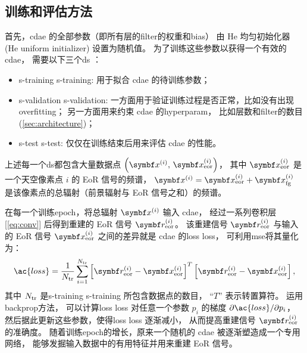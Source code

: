 \subsection{训练和评估方法}
\label{sec:train-eval}

首先，\ac{cdae} 的全部参数（即所有层的\ac{filter}的权重和\ac{bias}）
由 He 均匀初始化器 (He uniform initializer)\cite{he2015} 设置为随机值。
为了训练这些参数以获得一个有效的 \ac{cdae}，
需要以下三个\ac{ds} \cite{ripley1996}：
\begin{itemize}
  \item \acl{s-training} \ac{s-training}:
    用于拟合 \ac{cdae} 的待训练参数；
  \item \acl{s-validation} \ac{s-validation}:
    一方面用于验证训练过程是否正常，比如没有出现\ac{overfitting}；
    另一方面用来约束 \ac{cdae} 的\ac{hyperparam}，
    比如层数和\ac{filter}的数目 (\autoref{sec:architecture})；
  \item \acl{s-test} \ac{s-test}:
    仅仅在训练结束后用来评估 \ac{cdae} 的性能。
\end{itemize}
上述每一个\ac{ds}都包含大量数据点
$\left( \B{x}^{(i)}, \,\B{x}^{(i)}_{\R{eor}} \right)$，
其中 $\B{x}^{(i)}_{\R{eor}}$ 是一个天空像素点 $i$ 的 EoR 信号的频谱，
$\B{x}^{(i)} = \B{x}^{(i)}_{\R{eor}} + \B{x}^{(i)}_{\R{fg}}$
是该像素点的总辐射（前景辐射与 EoR 信号之和）的频谱。

在每一个训练\ac{epoch}，将总辐射 $\B{x}^{(i)}$ 输入 \ac{cdae}，
经过一系列卷积层 [\autoref{eq:conv}]
后得到重建的 EoR 信号 $\B{r}^{(i)}_{\R{eor}}$。
该重建信号 $\B{r}^{(i)}_{\R{eor}}$ 与输入的 EoR 信号 $\B{x}^{(i)}_{\R{eor}}$
之间的差异就是 \ac{cdae} 的\acl{loss} \ac{loss}，
可利用\ac{mse}将其量化为：
\begin{equation}
  \label{eq:loss}
  \ac{loss} = \frac{1}{N_{\R{tr}}} \sum_{i=1}^{N_{\R{tr}}}
    \left[ \B{r}_{\R{eor}}^{(i)} - \B{x}_{\R{eor}}^{(i)} \right]^T
    \left[ \B{r}_{\R{eor}}^{(i)} - \B{x}_{\R{eor}}^{(i)} \right] ,
\end{equation}
其中 $N_{\mathrm{tr}}$ 是\acl{s-training} \ac{s-training} 所包含数据点的数目，
\enquote{$T$} 表示转置算符。
运用\ac{backprop}方法\cite{rumelhart1986,leCun1998bp}，
可以计算\acl{loss} \ac{loss} 对任意一个参数 $p_i$ 的梯度
$\partial \ac{loss} / \partial p_i$，
然后据此更新这些参数，使得\acl{loss} \ac{loss} 逐渐减小，
从而提高重建信号 $\B{r}^{(i)}_{\R{eor}}$ 的准确度。
随着训练\ac{epoch}的增长，原来一个随机的 \ac{cdae} 被逐渐塑造成一个专用网络，
能够发掘输入数据中的有用特征并用来重建 EoR 信号。

